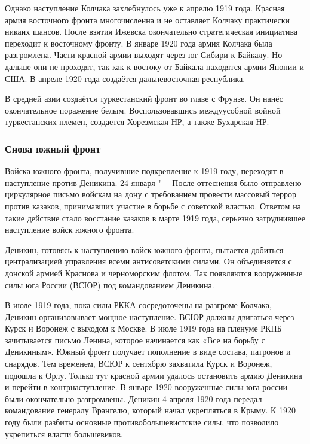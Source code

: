 Однако наступление Колчака захлебнулось уже к апрелю 1919 года. Красная армия восточного фронта многочисленна и не оставляет Колчаку практически никаих шансов. После взятия Ижевска окончательно стратегическая инициатива переходит к восточному фронту.
В январе 1920 года армия Колчака была разгромлена. Части красной армии выходят через юг Сибири к Байкалу. Но дальше они не проходят, так как к востоку от Байкала находятся армии Японии и США. В апреле 1920 года создаётся дальневосточная республика.

В средней азии создаётся туркестанский фронт во главе с Фрунзе. Он нанёс окончательное поражение белым. Воспользовавшись междуусобной войной туркестанских племен, создается Хорезмская НР, а также Бухарская НР.

\subsubsection{Снова южный фронт}

Войска южного фронта, получившие подкрепление к 1919 году, переходят в наступление против Деникина.
24 января "--- После оттеснения было отправлено циркулярное письмо войскам на дону с требованием провести массовый террор против казаков, принимавших участие в борьбе с советской властью.
Ответом на такие действие стало восстание казаков в марте 1919 года, серьезно затруднившее наступление войск южного фронта.

Деникин, готовясь к наступлению войск южного фронта, пытается добиться централизацией управления всеми антисоветскими силами. Он объединяется с донской армией Краснова и черноморским флотом. Так появляются вооруженные силы юга России (ВСЮР) под командованием Деникина.

В июле 1919 года, пока силы РККА сосредоточены на разгроме Колчака, Деникин организовывает мощное наступление. ВСЮР должны двигаться через Курск и Воронеж с выходом к Москве. В июле 1919 года на пленуме РКПБ зачитывается письмо Ленина, которое начинается как «Все на борьбу с Деникиным». Южный фронт получает пополнение в виде состава, патронов и снарядов. Тем временем, ВСЮР к сентябрю захватила Курск и Воронеж, подошла к Орлу. Только тут красной армии удалось остановить армию Деникина и перейти в контрнаступление. В январе 1920 вооруженные силы юга россии были окончательно разгромлены. Деникин 4 апреля 1920 года передал командование генералу Врангелю, который начал укрепляться в Крыму.
К 1920 году были разбиты основные противобольшевистские силы, что позволило укрепиться власти большевиков.

